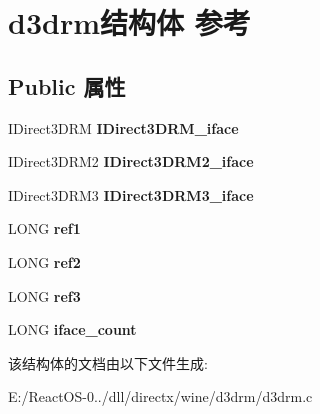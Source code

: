 \hypertarget{structd3drm}{}\section{d3drm结构体 参考}
\label{structd3drm}
\subsection*{Public 属性}
\begin{DoxyCompactItemize}
\item 
\mbox{\label{structd3drm_ad2d77a3bd889fc7f146f3145823e1dda}} 
I\+Direct3\+D\+RM {\bfseries I\+Direct3\+D\+R\+M\+\_\+iface}
\item 
\mbox{\label{structd3drm_a8111adaaeebf358f955dc59ad3cf8141}} 
I\+Direct3\+D\+R\+M2 {\bfseries I\+Direct3\+D\+R\+M2\+\_\+iface}
\item 
\mbox{\label{structd3drm_a5dd80e7a51e05bbbbb382b1d908074b8}} 
I\+Direct3\+D\+R\+M3 {\bfseries I\+Direct3\+D\+R\+M3\+\_\+iface}
\item 
\mbox{\label{structd3drm_a764fd7072ceb12e00830a8e135aaee53}} 
L\+O\+NG {\bfseries ref1}
\item 
\mbox{\label{structd3drm_aeb17a8034427f4e685fc3c382c5490bf}} 
L\+O\+NG {\bfseries ref2}
\item 
\mbox{\label{structd3drm_ad73edab9505506afd6444ab0c8c6fcdd}} 
L\+O\+NG {\bfseries ref3}
\item 
\mbox{\label{structd3drm_a7dc99329ba6c72c7ce4aa1b8c344ad71}} 
L\+O\+NG {\bfseries iface\+\_\+count}
\end{DoxyCompactItemize}


该结构体的文档由以下文件生成\+:\begin{DoxyCompactItemize}
\item 
E\+:/\+React\+O\+S-\/0../dll/directx/wine/d3drm/d3drm.\+c\end{DoxyCompactItemize}
